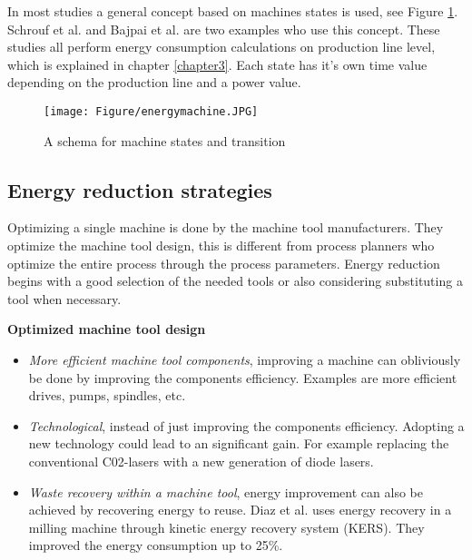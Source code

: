 In most studies a general concept based on machines states is used, see Figure \ref{fig:energymachine}. Schrouf et al.\cite{Shrouf2014} and Bajpai et al.\cite{Bajpai2018} are two examples who use this concept. These studies all perform energy consumption calculations on production line level, which is explained in chapter \ref{chapter3}. Each state has it's own time value depending on the production line and a power value.

\begin{figure}[h!]
	\centering
	\texttt{[image: Figure/energymachine.JPG]}
	\caption{A schema for machine states and transition \cite{Shrouf2014}}
	\label{fig:energymachine}
\end{figure}



\subsection{Energy reduction strategies}

Optimizing a single machine is done by the machine tool manufacturers. They optimize the machine tool design, this is different from process planners who optimize the entire process through the process parameters\cite{Duflou2012}. Energy reduction begins with a good selection of the needed tools or also considering substituting a tool when necessary.\newline

\textbf{Optimized machine tool design}

\begin{itemize}  
\item \textit{More efficient machine tool components}, improving a machine can obliviously be done by improving the components efficiency. Examples are more efficient drives, pumps, spindles, etc.
\item \textit{Technological}, instead of just improving the components efficiency. Adopting a new technology could lead to an significant gain. For example replacing the conventional C02-lasers with a new generation of diode lasers.
\item \textit{Waste recovery within a machine tool}, energy improvement can also be achieved by recovering energy to reuse. Diaz et al. \cite{Diaz2009} uses energy recovery in a milling machine through kinetic energy recovery system (KERS). They improved the energy consumption up to 25\%.
\end{itemize}


